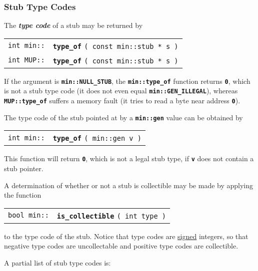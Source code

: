 \documentclass[12pt]{article}
\makeatletter
\newcommand{\TT}[1]{{\tt \bfseries #1}}
\newcommand{\key}[1]{{\bf \em #1}\index{#1}}
\newcommand{\ttindex}[1]{\index{#1@{\tt #1}}}
\newcommand{\EOL}{\penalty \exhyphenpenalty}
\newenvironment{indpar}[1][0.3in]%
	{\begin{list}{}%
		     {\setlength{\itemsep}{0in}%
		      \setlength{\topsep}{0in}%
		      \setlength{\parsep}{1ex}%
		      \setlength{\labelwidth}{#1}%
		      \setlength{\leftmargin}{#1}%
		      \addtolength{\leftmargin}{\labelsep}}%
	 \item}%
	{\end{list}}
\newcommand{\LABEL}[1]{\label{#1}}
\newcommand{\MINKEY}[1]%
	   {\TT{#1}\ttindex{min::#1}\ttindex{#1}}
\newcommand{\MUPKEY}[1]%
	   {\TT{#1}\ttindex{MUP::#1}\ttindex{#1}}
\makeatother
\begin{document}
\subsubsection{Stub Type Codes}
\label{STUB-TYPE-CODES}

The \key{type code} of a stub may be returned by

\begin{indpar}\begin{tabular}{r@{}l}
\verb|int min::| & \MINKEY{type\_of} \verb|( const min::stub * s )|
\LABEL{MIN::TYPE_OF} \\
\verb|int MUP::| & \MUPKEY{type\_of} \verb|( const min::stub * s )|
\LABEL{MUP::TYPE_OF}
\end{tabular}\end{indpar}

If the argument is \TT{min::NULL\_STUB},
the \TT{min::type\_of} function returns \TT{0}, which is not
a stub type code (it does not even equal \TT{min::GEN\_ILLEGAL}),
whereas \TT{MUP::\EOL type\_\EOL of} suffers a memory fault (it
tries to read a byte near address \TT{0}).

The type code of the stub pointed at by a \TT{min::gen} value
can be obtained by

\begin{indpar}\begin{tabular}{r@{}l}
\verb|int min::| & \MINKEY{type\_of} \verb|( min::gen v )|
\LABEL{MIN::TYPE_OF_GEN}
\end{tabular}\end{indpar}

This function will return \TT{0}, which is not a legal stub type,
if \TT{v} does not contain a stub pointer.

A determination of whether or not a stub is collectible may be made
by applying the function

\begin{indpar}\begin{tabular}{r@{}l}
\verb|bool min::| & \MINKEY{is\_collectible} \verb|( int type )|
\LABEL{MIN::IS_COLLECTIBLE}
\end{tabular}\end{indpar}

to the type code of the stub.  Notice that type codes are \underline{signed}
integers, so that negative type codes are uncollectable and positive type codes
are collectible.

A partial list of stub type codes is:
\end{document}
